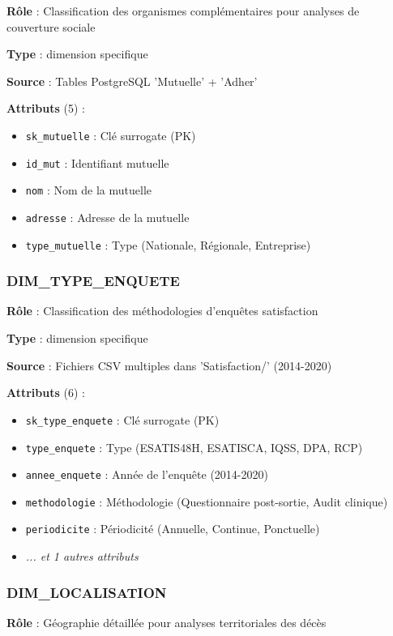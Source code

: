 \textbf{Rôle} : Classification des organismes complémentaires pour analyses de couverture sociale

\textbf{Type} : dimension specifique

\textbf{Source} : Tables PostgreSQL 'Mutuelle' + 'Adher'

\textbf{Attributs} (5) :
\begin{itemize}[leftmargin=*]
    \item \texttt{sk_mutuelle} : Clé surrogate (PK)
    \item \texttt{id_mut} : Identifiant mutuelle
    \item \texttt{nom} : Nom de la mutuelle
    \item \texttt{adresse} : Adresse de la mutuelle
    \item \texttt{type_mutuelle} : Type (Nationale, Régionale, Entreprise)
\end{itemize}

\subsubsection{DIM_TYPE_ENQUETE}

\textbf{Rôle} : Classification des méthodologies d'enquêtes satisfaction

\textbf{Type} : dimension specifique

\textbf{Source} : Fichiers CSV multiples dans 'Satisfaction/' (2014-2020)

\textbf{Attributs} (6) :
\begin{itemize}[leftmargin=*]
    \item \texttt{sk_type_enquete} : Clé surrogate (PK)
    \item \texttt{type_enquete} : Type (ESATIS48H, ESATISCA, IQSS, DPA, RCP)
    \item \texttt{annee_enquete} : Année de l'enquête (2014-2020)
    \item \texttt{methodologie} : Méthodologie (Questionnaire post-sortie, Audit clinique)
    \item \texttt{periodicite} : Périodicité (Annuelle, Continue, Ponctuelle)
    \item \textit{... et 1 autres attributs}
\end{itemize}

\subsubsection{DIM_LOCALISATION}

\textbf{Rôle} : Géographie détaillée pour analyses territoriales des décès

